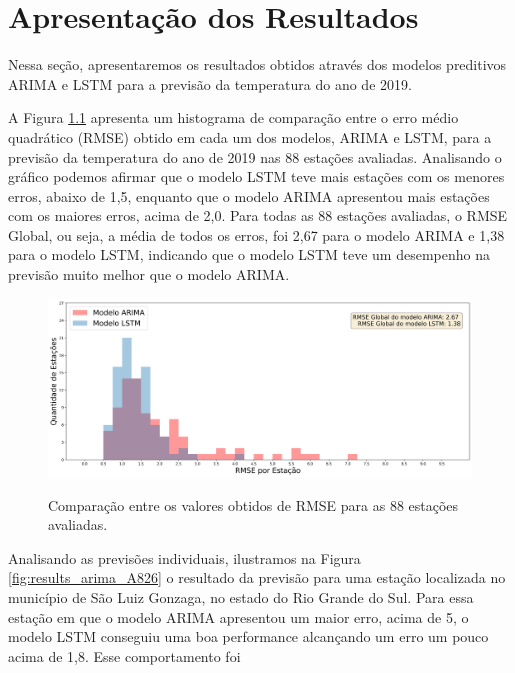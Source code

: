 \chapter{Apresentação dos Resultados}

Nessa seção, apresentaremos os resultados obtidos através dos modelos preditivos ARIMA e LSTM para a previsão da temperatura do ano de 2019. 

A Figura \ref{fig:results_histogram_arima_model_rmse} apresenta um histograma de comparação entre o erro médio quadrático (RMSE) obtido em cada um dos modelos, ARIMA e LSTM, para a previsão da temperatura do ano de 2019 nas 88 estações avaliadas. Analisando o gráfico podemos afirmar que o modelo LSTM teve mais estações com os menores erros, abaixo de 1,5, enquanto que o modelo ARIMA apresentou mais estações com os maiores erros, acima de 2,0. Para todas as 88 estações avaliadas, o RMSE  Global, ou seja, a média de todos os erros, foi 2,67 para o modelo ARIMA e 1,38 para o modelo LSTM, indicando que o modelo LSTM teve um desempenho na previsão muito melhor que o modelo ARIMA. 
 
 \begin{figure}[H]
    \centering
    \caption{Comparação entre os valores obtidos de RMSE para as 88 estações avaliadas.}
    \includegraphics[width=\textwidth]{figuras/results/comparacao_rmse_arima_lstm_histograma.png}
    \label{fig:results_histogram_arima_model_rmse}
\end{figure}

Analisando as previsões individuais, ilustramos na Figura \ref{fig:results_arima_A826} o resultado da previsão para uma estação localizada no município de São Luiz Gonzaga, no estado do Rio Grande do Sul. Para essa estação em que o modelo ARIMA apresentou um maior erro, acima de 5, o modelo LSTM conseguiu uma boa performance alcançando um erro um pouco acima de 1,8. Esse comportamento foi

